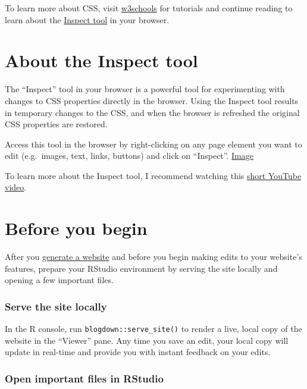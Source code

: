 \documentclass[
]{book}
\begin{document}
To learn more about CSS, visit \href{https://www.w3schools.com/css/}{w3schools} for tutorials and continue reading to learn about the \protect\hyperlink{inspect-tool}{Inspect tool} in your browser.

\hypertarget{inspect-tool}{%
\section{About the Inspect tool}\label{inspect-tool}}

The ``Inspect'' tool in your browser is a powerful tool for experimenting with changes to CSS properties directly in the browser. Using the Inspect tool results in temporary changes to the CSS, and when the browser is refreshed the original CSS properties are restored.

Access this tool in the browser by right-clicking on any page element you want to edit (e.g.~images, text, links, buttons) and click on ``Inspect''. \href{https://i.imgur.com/0h0H4VW.png}{Image}

To learn more about the Inspect tool, I recommend watching this \href{https://www.youtube.com/watch?v=1l4xz1QQhew}{short YouTube video}.

\hypertarget{before-you-begin}{%
\section{Before you begin}\label{before-you-begin}}

After you \protect\hyperlink{generate}{generate a website} and before you begin making edits to your website's features, prepare your RStudio environment by serving the site locally and opening a few important files.

\hypertarget{serve-the-site-locally}{%
\subsubsection*{Serve the site locally}\label{serve-the-site-locally}}

In the R console, run \texttt{blogdown::serve\_site()} to render a live, local copy of the website in the ``Viewer'' pane. Any time you save an edit, your local copy will update in real-time and provide you with instant feedback on your edits.

\hypertarget{open-important-files-in-rstudio}{%
\subsubsection*{Open important files in RStudio}\label{open-important-files-in-rstudio}}
\end{document}
